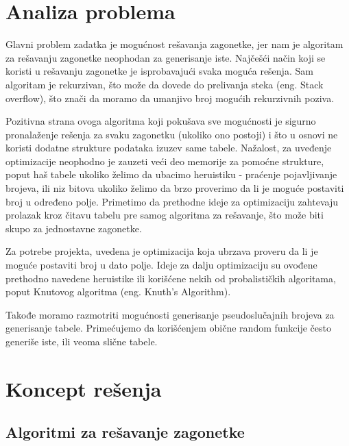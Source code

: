 \documentclass[a4paper]{article}
\begin{document}
    \section{Analiza problema}
    \par Glavni problem zadatka je mogućnost rešavanja zagonetke, jer nam je algoritam za rešavanju zagonetke neophodan za generisanje iste.
    Najčešći način koji se koristi u rešavanju zagonetke je isprobavajući svaka moguća rešenja. Sam algoritam je rekurzivan, što može da dovede do 
    prelivanja steka (eng. Stack overflow), što znači da moramo da umanjivo broj mogućih rekurzivnih poziva.
    \par Pozitivna strana ovoga algoritma koji pokušava sve mogućnosti je sigurno pronalaženje rešenja za svaku zagonetku (ukoliko ono postoji) i što u osnovi ne koristi dodatne strukture podataka izuzev same tabele.
    Nažalost, za uveđenje optimizacije neophodno je zauzeti veći deo memorije za pomoćne strukture, poput haš tabele ukoliko želimo da ubacimo heruistiku - praćenje pojavljivanje brojeva, ili niz bitova
    ukoliko želimo da brzo proverimo da li je moguće postaviti broj u određeno polje. Primetimo da prethodne ideje za optimizaciju zahtevaju prolazak kroz čitavu tabelu pre samog algoritma za rešavanje,
    što može biti skupo za jednostavne zagonetke.
    \par Za potrebe projekta, uvedena je optimizacija koja ubrzava proveru da li je moguće postaviti broj u dato polje. Ideje za dalju optimizaciju su ovođene prethodno navedene heruistike ili
    korišćene nekih od probalističkih algoritama, poput Knutovog algoritma (eng. Knuth's Algorithm). 
    \par Takođe moramo razmotriti mogućnosti generisanje pseudoslučajnih brojeva za generisanje tabele. Primećujemo da korišćenjem obične random funkcije često generiše iste,
    ili veoma slične tabele.
    \newpage

    \section{Koncept rešenja}
    
    \subsection{Algoritmi za rešavanje zagonetke}
\end{document}
